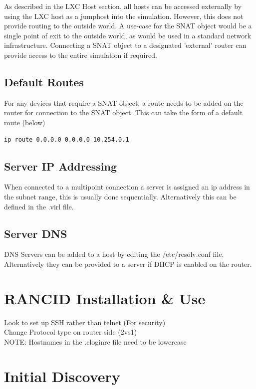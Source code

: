 \documentclass[11pt]{report}
\begin{document}
As described in the LXC Host section, all hosts can be accessed externally by using the LXC host as a jumphost into the simulation. However, this does not provide routing to the outside world. A use-case for the SNAT object would be a single point of exit to the outside world, as would be used in a standard network infrastructure. Connecting a SNAT object to a designated 'external' router can provide access to the entire simulation if required.

\subsection*{Default Routes}

For any devices that require a SNAT object, a route needs to be added on the router for connection to the SNAT object. This can take the form of a default route (below)

\begin{lstlisting}
ip route 0.0.0.0 0.0.0.0 10.254.0.1
\end{lstlisting}

\subsection*{Server IP Addressing}

When connected to a multipoint connection a server is assigned an ip address in the subnet range, this is usually done sequentially. Alternatively this can be defined in the .virl file.

\subsection*{Server DNS}

DNS Servers can be added to a host by editing the /etc/resolv.conf file. Alternatively they can be provided to a server if DHCP is enabled on the router.

\section*{RANCID Installation \& Use}

Look to set up SSH rather than telnet (For security)
\\
Change Protocol type on router side (2vs1)
\\
NOTE: Hostnames in the .cloginrc file need to be lowercase

\section*{Initial Discovery}
\end{document}
